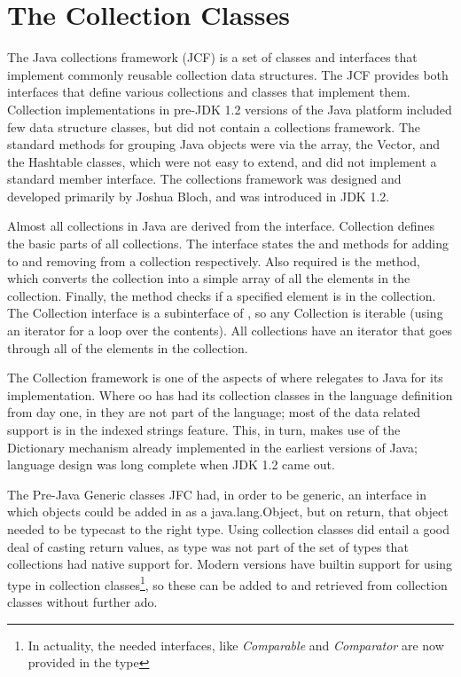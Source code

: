 {\section{The Collection Classes}
The Java collections framework (JCF) is a set of classes and interfaces that implement commonly reusable collection data structures.
The JCF provides both interfaces that define various
collections and classes that implement them. Collection
implementations in pre-JDK 1.2 versions of the Java platform included
few data structure classes, but did not contain a collections
framework. The standard methods for grouping Java objects were via the array, the Vector, and the Hashtable classes, which were not easy to extend, and did not implement a standard member interface.
The collections framework was designed and developed primarily by
Joshua Bloch, and was introduced in JDK 1.2.

Almost all collections in Java are derived from the
 interface. Collection defines the basic parts of
all collections. The interface states the  and  methods
for adding to and removing from a collection respectively. Also
required is the  method, which converts the collection into a
simple array of all the elements in the collection. Finally, the
 method checks if a specified element is in the
collection. The Collection interface is a subinterface of
, so any Collection is iterable (using an
iterator for a loop over the contents).
All collections have an iterator that goes
through all of the elements in the collection.

The Collection framework is one of the aspects of where \nr{}
relegates to Java for its implementation. Where oo\Rexx{} has had its
collection classes in the language definition from day one, in \nr{}
they are not part of the language; most of the data related support is
in the indexed strings feature. This, in turn, makes use of the
Dictionary mechanism already implemented in the earliest versions of Java;
\nr{} language design was long complete when JDK 1.2 came out.

The Pre-Java Generic classes JFC had, in order to be generic, an
interface in which objects could be added in as a java.lang.Object,
but on return, that object needed to be typecast to the right type.
Using collection classes did entail a good deal of casting return
values, as type \Rexx{} was not part of the set of types that
collections had native support for. Modern \nr{} versions
 have builtin support for using type
\Rexx{} in collection classes\footnote{In actuality, the needed
  interfaces, like \emph{Comparable} and \emph{Comparator} are now
  provided in the \Rexx{} type}, so these can be added to and
retrieved from collection classes without further ado. 

}
